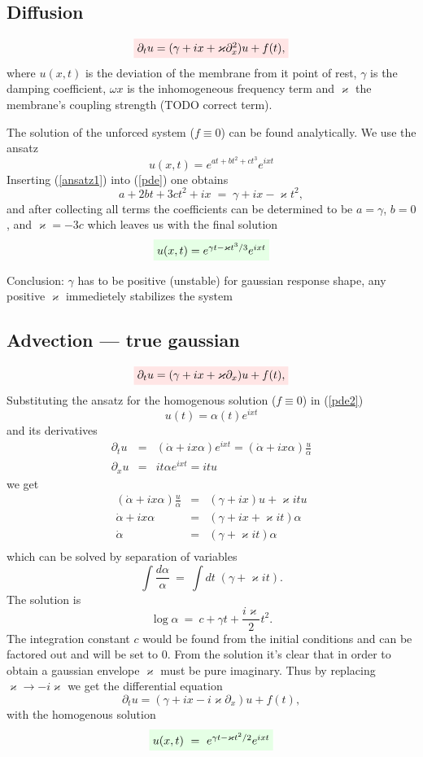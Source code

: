 \documentclass[11pt,twocolumn]{article}
\newcommand{\be}{\begin{equation}}
\newcommand{\ee}{\end{equation}}
\newcommand{\bea}{\begin{eqnarray*}}
\newcommand{\eea}{\end{eqnarray*}}
\newcommand{\rbox}[1]{\colorbox{red!10}{$#1$}}
\newcommand{\gbox}[1]{\colorbox{green!10}{$#1$}}
\begin{document}
\subsection{Diffusion}


\be \label{pde}
   \rbox{\partial_t u = (\gamma + i x + \varkappa \partial_x^2 ) u  +  f(t),}
\ee
where $u(x,t)$ is the deviation of the membrane from it point of rest, $\gamma$ is the damping coefficient,
$\omega x$ is the inhomogeneous frequency term and $\varkappa$ the membrane's coupling strength (TODO correct term).

The solution of the unforced system ($f \equiv 0$) can be found analytically. We use the ansatz
\be \label{ansatz1}
   u(x,t) = e^{at + bt^2 + ct^3} e^{ixt}
\ee
Inserting (\ref{ansatz1}) into (\ref{pde}) one obtains
$$
   a  +  2 b t  +  3 c t^2  +  ix \; = \; \gamma + i x - \varkappa t^2,
$$
and after collecting all terms the coefficients can be determined to be $a=\gamma$, $b=0$, and $\varkappa = -3c$
which leaves us with the final solution
\be \label{pde-solution}
   \gbox{u(x,t) = e^{\gamma t - \varkappa t^3/3} e^{ixt}}
\ee

Conclusion: $\gamma$ has to be positive (unstable) for gaussian response shape,
any positive $\varkappa$ immedietely stabilizes the system




\subsection{Advection --- true gaussian}


\be \label{pde2}
    \rbox{\partial_t u = (\gamma + i x + \varkappa \partial_x ) u  +  f(t),}
\ee
Substituting the ansatz for the homogenous solution ($f \equiv 0$) in (\ref{pde2})
\be \label{pde2ansatz}
   u(t) = \alpha(t) e^{ixt}
\ee
and its derivatives
\bea
   \partial_t u  &=&  ( \dot{\alpha} + ix\alpha ) e^{ixt} = ( \dot{\alpha} + ix\alpha ) \frac{u}{\alpha}\\
   \partial_x u  &=&  it\alpha e^{ixt} = itu
\eea
we get
\bea
   ( \dot{\alpha} + ix\alpha ) \frac{u}{\alpha}  &=&  (\gamma + i x) u + \varkappa itu\\
     \dot{\alpha} + ix\alpha  &=&  (\gamma + i x + \varkappa it ) \alpha\\
     \dot{\alpha}  &=&  (\gamma + \varkappa it) \alpha\\
\eea
which can be solved by separation of variables
\be
   \int\! \frac{d\alpha}{\alpha} \ =\  \int\!\! dt \; (\gamma + \varkappa it).
\ee
The solution is
\be
   \log \alpha \ = \ c + \gamma t + \frac{i\varkappa}{2} t^2.
\ee
The integration constant $c$ would be found from the initial conditions and can be factored out and will be set to 0. From the solution it's clear that in order to obtain a gaussian envelope $\varkappa$ must be pure imaginary. Thus by replacing $\varkappa \rightarrow -i\varkappa$ we get the differential equation
\be \label{pde2a}
   \partial_t u = (\gamma + i x - i\varkappa \partial_x ) u  +  f(t),
\ee
with the homogenous solution
\be \label{pde2a_solution}
    \gbox{u(x,t) \ = \ e^{\gamma t - \varkappa t^2 / 2} e^{ixt}}
\ee
\end{document}
